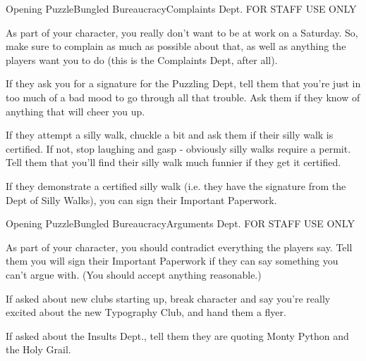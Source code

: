\begin{customPuzzle}{Opening Puzzle}{Bungled Bureaucracy}{Complaints Dept.}
  FOR STAFF USE ONLY

  As part of your character, you really don't want to be at work on a
  Saturday. So, make sure to complain as much as possible about that,
  as well as anything the players want you to do (this is the Complaints
  Dept, after all).

  If they ask you for a signature for the Puzzling Dept, tell them that you're
  just in too much of a bad mood to go through all that trouble. Ask them
  if they know of anything that will cheer you up.

  If they attempt a silly walk, chuckle a bit and ask them if their silly
  walk is certified. If not, stop laughing and gasp - obviously silly
  walks require a permit. Tell them that you'll find their silly walk
  much funnier if they get it certified.

  If they demonstrate a certified silly walk (i.e. they have the signature
  from the Dept of Silly Walks), you can sign their Important Paperwork.
\end{customPuzzle}

\begin{customPuzzle}{Opening Puzzle}{Bungled Bureaucracy}{Arguments Dept.}
  FOR STAFF USE ONLY

  As part of your character, you should contradict everything the players
  say. Tell them you will sign their Important Paperwork
  if they can say something you
  can't argue with. (You should accept anything reasonable.)

  If asked about new clubs starting up, break character and say you're
  really excited about the new Typography Club, and hand them a flyer.

  If asked about the Insults Dept., tell them they are quoting Monty Python
  and the Holy Grail.
\end{customPuzzle}


